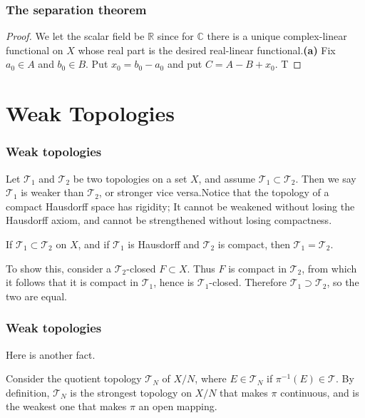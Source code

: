 \documentclass{beamer}
\begin{document}
\begin{frame}
\frametitle{The separation theorem}
\begin{proof}
    We let the scalar field be $\mathbb{R}$ since for $\mathbb{C}$ there is a unique complex-linear functional on $X$ whose real part is the desired real-linear functional.\newline\newline \textbf{(a)} Fix $a_0 \in A$ and $b_0 \in B$. Put $x_0 = b_0-a_0$ and put $C = A-B + x_0$. T
\end{proof}
\end{frame}
\begin{frame}
\frametitle{}
\end{frame}

\section{Weak Topologies}
\begin{frame}
\frametitle{Weak topologies}
Let $\mathcal{T}_1$ and $\mathcal{T}_2$ be two topologies on a set $X$, and assume $\mathcal{T}_1 \subset \mathcal{T}_2$. Then we say $\mathcal{T}_1$ is weaker than $\mathcal{T}_2$, or stronger vice versa.\newline\newline Notice that the topology of a compact Hausdorff space has rigidity; It cannot be weakened without losing the Hausdorff axiom, and cannot be strengthened without losing compactness.\begin{fact}
    If $\mathcal{T}_1 \subset \mathcal{T}_2$ on $X$, and if $\mathcal{T}_1$ is Hausdorff and $\mathcal{T}_2$ is compact, then $\mathcal{T}_1 = \mathcal{T}_2$.
\end{fact}
To show this, consider a $\mathcal{T}_2$-closed $F \subset X$. Thus $F$ is compact in $\mathcal{T}_2$, from which it follows that it is compact in $\mathcal{T}_1$, hence is $\mathcal{T}_1$-closed. Therefore $\mathcal{T}_1 \supset \mathcal{T}_2$, so the two are equal.
\end{frame}
\begin{frame}
\frametitle{Weak topologies}
Here is another fact.\begin{fact}
    Consider the quotient topology $\mathcal{T}_N$ of $X/N$, where $E \in \mathcal{T}_N$ if $\pi^{-1}(E) \in \mathcal{T}$. By definition, $\mathcal{T}_N$ is the strongest topology on $X/N$ that makes $\pi$ continuous, and is the weakest one that makes $\pi$ an open mapping.
\end{fact}
\end{frame}
\end{document}
